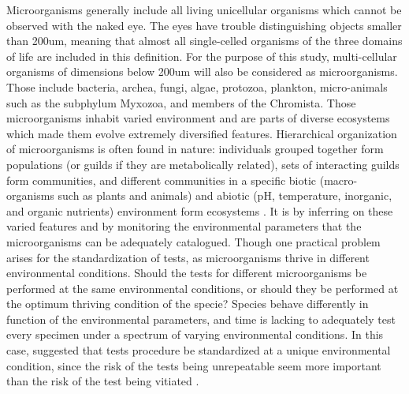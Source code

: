 Microorganisms generally include all living unicellular organisms which cannot be observed with the naked eye. The eyes have trouble distinguishing objects smaller than 200um, meaning that almost all single-celled organisms of the three domains of life are included in this definition. For the purpose of this study, multi-cellular organisms of dimensions below 200um will also be considered as microorganisms. Those include bacteria, archea, fungi, algae, protozoa, plankton, micro-animals such as the subphylum Myxozoa, and members of the Chromista. Those microorganisms inhabit varied environment and are parts of diverse ecosystems which made them evolve extremely diversified features. Hierarchical organization of microorganisms is often found in nature: individuals grouped together form populations (or guilds if they are metabolically related), sets of interacting guilds form communities, and different communities in a specific biotic (macro-organisms such as plants and animals) and abiotic (pH, temperature, inorganic, and organic nutrients) environment form ecosystems \cite{Hutchins2019}. It is by inferring on these varied features and by monitoring the environmental parameters that the microorganisms can be adequately catalogued. Though one practical problem arises for the standardization of tests, as microorganisms thrive in different environmental conditions. Should the tests for different microorganisms be performed at the same environmental conditions, or should they be performed at the optimum thriving condition of the specie? Species behave differently in function of the environmental parameters, and time is lacking to adequately test every specimen under a spectrum of varying environmental conditions. In this case, \citep{cowan1956ordnung} suggested that tests procedure be standardized at a unique environmental condition, since the risk of the tests being unrepeatable seem more important than the risk of the test being vitiated \cite{Sneath1957}. \par

